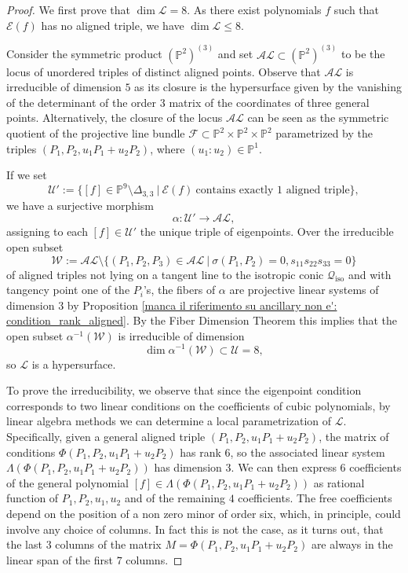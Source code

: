 \documentclass{amsart}
\theoremstyle{plain}
\theoremstyle{definition}
\newcommand{\p}{\mathbb{P}}
\newcommand{\sL}{\mathcal{L}}
\newcommand{\sU}{\mathcal{U}}
\newcommand{\sF}{\mathcal{F}}
\newcommand{\iso}{\mathcal{Q}_{\mathrm{iso}}}
\newcommand{\Eig}[1]{\mathcal{E}\!\left( {#1} \right)}
\begin{document}
\begin{proof}
We first prove that $\dim \mathcal{L}=8$. As there exist
polynomials $f$ such that $\Eig{f}$ has no aligned triple, we have $\dim \mathcal{L} \le 8$.


Consider the symmetric product $(\p^2) ^{(3)}$ and set $\mathcal {AL} \subset (\p^2) ^{(3)}$ to be the locus of unordered triples of distinct aligned points. Observe that $\mathcal {AL}$ is irreducible of dimension $5$ as its closure is the hypersurface given by the vanishing of the determinant of the order $3$ matrix of the coordinates of three general points. Alternatively, the closure of the locus $\mathcal {AL}$ can be seen as the symmetric quotient of the projective line bundle $\sF \subset \p^2 \times \p^2 \times \p^2$ parametrized by the triples $(P_1, P_2, u_1 P_1 +u_2P_2)$, where $(u_1:u_2) \in \p^1$.

If we set
$$
\sU':= \{[f]\in \p^9 \setminus \Delta_{3,3} \ | \ \Eig{f} \ \textrm {contains \ exactly \ $1$ \ aligned \ triple}\},
$$
we have a surjective morphism
$$
\alpha : \mathcal{U}' \to \mathcal {AL},
$$
assigning to each $[f] \in \mathcal{U}'$ the unique triple of eigenpoints. Over the irreducible open subset
$$
\mathcal W := \mathcal {AL}
\setminus \{(P_1,P_2,P_3)\in\mathcal {AL}
\ | \ \sigma(P_1,P_2)=0, s_{11} s_{22} s_{33}=0\}
$$
of aligned triples not lying
on a tangent line to the isotropic conic $\iso$ and with tangency point one of the $P_i$'s, the fibers of $\alpha$ are projective linear systems of dimension $3$ by
Proposition \ref{manca il riferimento su ancillary    non e': condition_rank_aligned}. By the Fiber Dimension Theorem this implies that the open subset $\alpha ^{-1} (\mathcal W)$ is irreducible of dimension
$$
\dim \alpha ^{-1} (\mathcal W)
\subset \sU=8 ,
$$
so $\sL$ is a hypersurface.


To prove the irreducibility, we observe that since the eigenpoint condition corresponds to two linear conditions on the coefficients of cubic polynomials, by linear algebra methods we can determine a local parametrization of $\sL$.
Specifically, given a general aligned triple $(P_1, P_2, u_1 P_1 +u_2P_2)$, the matrix of conditions $\Phi(P_1, P_2, u_1 P_1 +u_2P_2)$ has rank $6$, so the associated linear system
$\Lambda (\Phi(P_1, P_2, u_1 P_1 +u_2P_2))$ has dimension $3$. We can then express $6$ coefficients of the general polynomial
$[f]\in \Lambda (\Phi(P_1, P_2, u_1 P_1 +u_2P_2))$ as rational function of $P_1,P_2,u_1,u_2$ and of the remaining $4$ coefficients. The free coefficients depend on the position of a non zero minor of order six, which, in principle, could involve any choice of columns. In fact this is not the case, as it turns out, that the last $3$ columns of the matrix
$M = \Phi(P_1, P_2, u_1 P_1 +u_2P_2)$ are always in the linear span of the first $7$ columns.


\end{proof}
\end{document}
